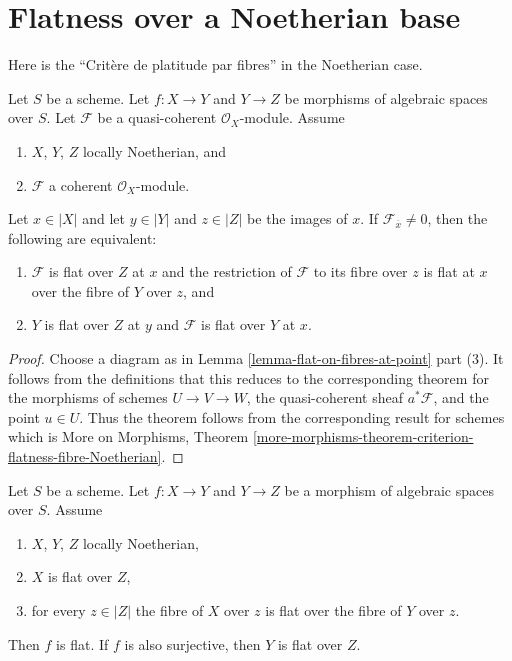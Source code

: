 \section{Flatness over a Noetherian base}
\label{section-flat-over-Noetherian}

\noindent
Here is the ``Crit\`ere de platitude par fibres'' in the Noetherian case.

\begin{theorem}
\label{theorem-criterion-flatness-fibre-Noetherian}
Let $S$ be a scheme.
Let $f : X \to Y$ and $Y \to Z$ be morphisms of algebraic spaces over $S$.
Let $\mathcal{F}$ be a quasi-coherent $\mathcal{O}_X$-module.
Assume
\begin{enumerate}
\item $X$, $Y$, $Z$ locally Noetherian, and
\item $\mathcal{F}$ a coherent $\mathcal{O}_X$-module.
\end{enumerate}
Let $x \in |X|$ and let $y \in |Y|$ and $z \in |Z|$ be the images of
$x$. If $\mathcal{F}_{\overline{x}} \not = 0$, then the following are
equivalent:
\begin{enumerate}
\item $\mathcal{F}$ is flat over $Z$ at $x$ and
the restriction of $\mathcal{F}$ to its fibre over $z$
is flat at $x$ over the fibre of $Y$ over $z$, and
\item $Y$ is flat over $Z$ at $y$ and $\mathcal{F}$ is
flat over $Y$ at $x$.
\end{enumerate}
\end{theorem}

\begin{proof}
Choose a diagram as in
Lemma \ref{lemma-flat-on-fibres-at-point} part (3).
It follows from the definitions that this reduces to the
corresponding theorem for the morphisms of schemes
$U \to V \to W$, the quasi-coherent sheaf $a^*\mathcal{F}$,
and the point $u \in U$. Thus the theorem follows from the
corresponding result for schemes which is
More on Morphisms,
Theorem \ref{more-morphisms-theorem-criterion-flatness-fibre-Noetherian}.
\end{proof}

\begin{lemma}
\label{lemma-morphism-between-flat-Noetherian}
Let $S$ be a scheme.
Let $f : X \to Y$ and $Y \to Z$ be a morphism of algebraic spaces over $S$.
Assume
\begin{enumerate}
\item $X$, $Y$, $Z$ locally Noetherian,
\item $X$ is flat over $Z$,
\item for every $z \in |Z|$ the fibre of $X$ over $z$
is flat over the fibre of $Y$ over $z$.
\end{enumerate}
Then $f$ is flat. If $f$ is also surjective, then $Y$ is flat over $Z$.
\end{lemma}

